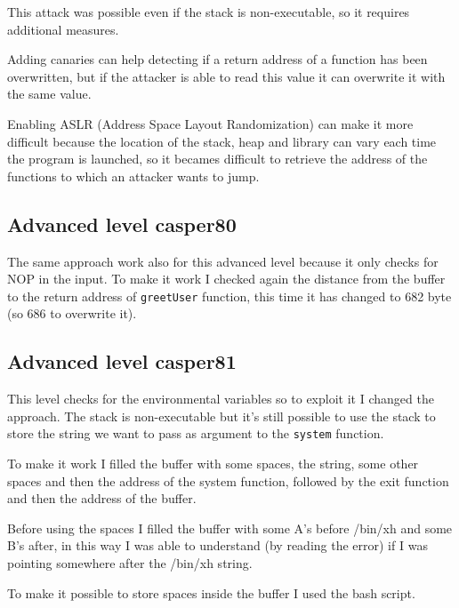 \documentclass[a4paper,12pt]{article}
\begin{document}
This attack was possible even if the stack is non-executable, so it requires additional measures.

Adding canaries can help detecting if a return address of a function has been overwritten, but if the attacker is able to read this value it can overwrite it with the same value.

Enabling ASLR (Address Space Layout Randomization) can make it more difficult because the location of the stack, heap and library can vary each time the program is launched, so it becames difficult to retrieve the address of the functions to which an attacker wants to jump.



\subsection{Advanced level casper80}

The same approach work also for this advanced level because it only checks for NOP in the input. To make it work I checked again the distance from the buffer to the return address of \texttt{greetUser} function, this time it has changed to 682 byte (so 686 to overwrite it). %
\subsection{Advanced level casper81}
This level checks for the environmental variables so to exploit it I changed the approach. The stack is non-executable but it's still possible to use the stack to store the string we want to pass as argument to the \texttt{system} function.

To make it work I filled the buffer with some spaces, the string, some other spaces and then the address of the system function, followed by the exit function and then the address of the buffer.

Before using the spaces I filled the buffer with some A's before /bin/xh and some B's after, in this way I was able to understand (by reading the error) if I was pointing somewhere after the /bin/xh string.

To make it possible to store spaces inside the buffer I used the bash script.
\end{document}
